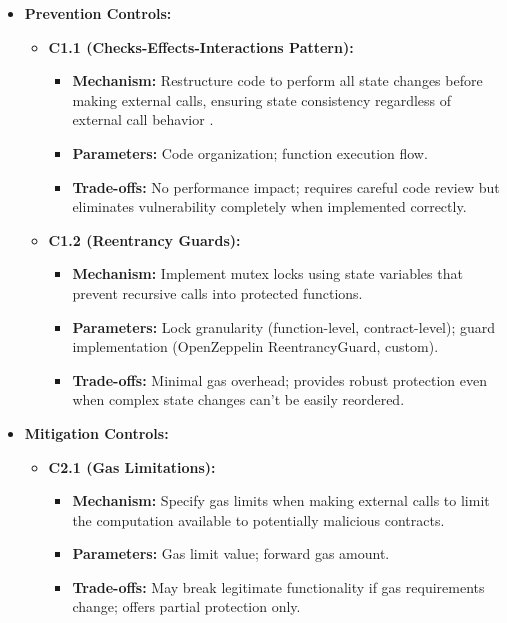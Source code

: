 \begin{itemize}
\item \textbf{Prevention Controls:}
    \begin{itemize}
    \item \textbf{C1.1 (Checks-Effects-Interactions Pattern):}
        \begin{itemize}
        \item \textbf{Mechanism:} Restructure code to perform all state changes before making external calls, ensuring state consistency regardless of external call behavior \cite{praitheeshan2019systematic}.
        \item \textbf{Parameters:} Code organization; function execution flow.
        \item \textbf{Trade-offs:} No performance impact; requires careful code review but eliminates vulnerability completely when implemented correctly.
        \end{itemize}
    
    \item \textbf{C1.2 (Reentrancy Guards):}
        \begin{itemize}
        \item \textbf{Mechanism:} Implement mutex locks using state variables that prevent recursive calls into protected functions.
        \item \textbf{Parameters:} Lock granularity (function-level, contract-level); guard implementation (OpenZeppelin ReentrancyGuard, custom).
        \item \textbf{Trade-offs:} Minimal gas overhead; provides robust protection even when complex state changes can't be easily reordered.
        \end{itemize}
    \end{itemize}

\item \textbf{Mitigation Controls:}
    \begin{itemize}
    \item \textbf{C2.1 (Gas Limitations):}
        \begin{itemize}
        \item \textbf{Mechanism:} Specify gas limits when making external calls to limit the computation available to potentially malicious contracts.
        \item \textbf{Parameters:} Gas limit value; forward gas amount.
        \item \textbf{Trade-offs:} May break legitimate functionality if gas requirements change; offers partial protection only\cite{atzei2017survey}.
        \end{itemize}
    

\end{itemize}
\end{itemize}
